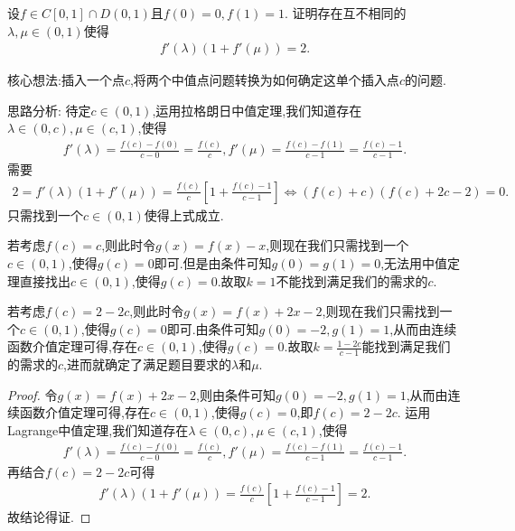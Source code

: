 \documentclass[../../main.tex]{subfiles}%
\begin{document}
\begin{example}
设\(f\in C[0,1]\cap D(0,1)\)且\(f(0)=0,f(1)=1\). 证明存在互不相同的\(\lambda,\mu\in(0,1)\)使得
\begin{align*}
f'(\lambda)(1 + f'(\mu))=2.
\end{align*} 
\end{example}
\begin{note}
核心想法:插入一个点$c$,将两个中值点问题转换为如何确定这单个插入点$c$的问题.
\end{note}
\begin{remark}
思路分析:
待定\(c\in(0,1)\),运用拉格朗日中值定理,我们知道存在\(\lambda\in(0,c),\mu\in(c,1)\),使得
\begin{align*}
f'(\lambda)=\frac{f(c)-f(0)}{c - 0}=\frac{f(c)}{c},f'(\mu)=\frac{f(c)-f(1)}{c - 1}=\frac{f(c)-1}{c - 1}.
\end{align*}
需要
\begin{align*}
2=f' (\lambda )(1+f' (\mu ))=\frac{f(c)}{c}\left[ 1+\frac{f(c)-1}{c-1} \right] \Longleftrightarrow \left( f\left( c \right) +c \right) \left( f\left( c \right) +2c-2 \right) =0.
\end{align*}
只需找到一个\(c\in(0,1)\)使得上式成立.

若考虑\(f(c)=c\),则此时令\(g(x)=f(x)-x\),则现在我们只需找到一个\(c\in(0,1)\),使得\(g(c)=0\)即可.但是由条件可知\(g(0)=g(1)=0\),无法用中值定理直接找出\(c\in(0,1)\),使得\(g(c)=0\).故取$k=1$不能找到满足我们的需求的$c$.

若考虑\(f(c)=2 - 2c\),则此时令\(g(x)=f(x)+2x - 2\),则现在我们只需找到一个\(c\in(0,1)\),使得\(g(c)=0\)即可.由条件可知\(g(0)=-2,g(1)=1\),从而由连续函数介值定理可得,存在\(c\in(0,1)\),使得\(g(c)=0\).故取$k=\frac{1 - 2c}{c - 1}$能找到满足我们的需求的$c$,进而就确定了满足题目要求的\(\lambda\)和\(\mu\). 
\end{remark}
\begin{proof}
令\(g(x)=f(x)+2x - 2\),则由条件可知\(g(0)=-2,g(1)=1\),从而由连续函数介值定理可得,存在\(c\in(0,1)\),使得\(g(c)=0\),即\(f(c)=2 - 2c\). 
运用Lagrange中值定理,我们知道存在\(\lambda\in(0,c),\mu\in(c,1)\),使得
\begin{align*}
f'(\lambda)=\frac{f(c)-f(0)}{c - 0}=\frac{f(c)}{c},f'(\mu)=\frac{f(c)-f(1)}{c - 1}=\frac{f(c)-1}{c - 1}.
\end{align*}
再结合$f(c)=2-2c$可得
\begin{align*}
f' (\lambda )(1+f' (\mu ))=\frac{f(c)}{c}\left[ 1+\frac{f(c)-1}{c-1} \right] =2.
\end{align*}
故结论得证.
\end{proof}
\end{document}

